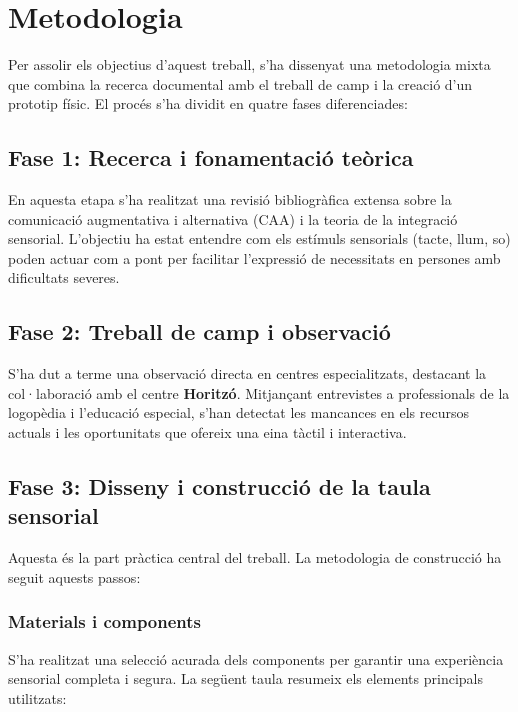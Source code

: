 \chapter{Metodologia}

Per assolir els objectius d'aquest treball, s'ha dissenyat una metodologia mixta que combina la recerca documental amb el treball de camp i la creació d'un prototip físic. El procés s'ha dividit en quatre fases diferenciades:

\section{Fase 1: Recerca i fonamentació teòrica}
En aquesta etapa s'ha realitzat una revisió bibliogràfica extensa sobre la comunicació augmentativa i alternativa (CAA) i la teoria de la integració sensorial. L'objectiu ha estat entendre com els estímuls sensorials (tacte, llum, so) poden actuar com a pont per facilitar l'expressió de necessitats en persones amb dificultats severes.

\section{Fase 2: Treball de camp i observació}
S'ha dut a terme una observació directa en centres especialitzats, destacant la col·laboració amb el centre \textbf{Horitzó}. Mitjançant entrevistes a professionals de la logopèdia i l'educació especial, s'han detectat les mancances en els recursos actuals i les oportunitats que ofereix una eina tàctil i interactiva.

\section{Fase 3: Disseny i construcció de la taula sensorial}
Aquesta és la part pràctica central del treball. La metodologia de construcció ha seguit aquests passos:

\subsection{Materials i components}
S'ha realitzat una selecció acurada dels components per garantir una experiència sensorial completa i segura. La següent taula resumeix els elements principals utilitzats:

